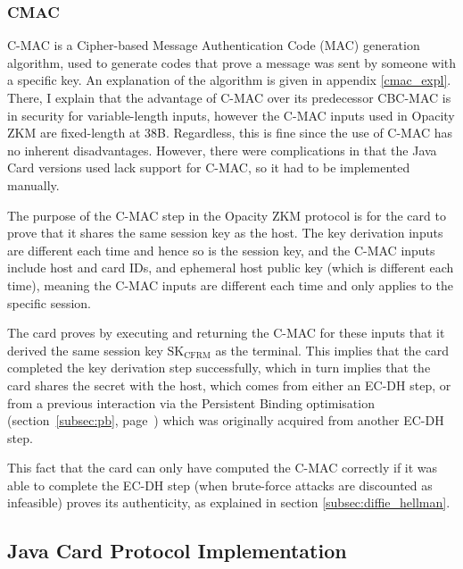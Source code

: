 \documentclass[12pt,a4paper]{article}
\begin{document}
\subsubsection{CMAC}
\label{subsec:cmac}
C-MAC is a Cipher-based Message Authentication Code (MAC) generation algorithm, used to generate codes that prove a message was sent by someone with a specific key. An explanation of the algorithm is given in appendix \ref{cmac_expl}. There, I explain that the advantage of C-MAC over its predecessor CBC-MAC is in security for variable-length inputs, however the C-MAC inputs used in Opacity ZKM are fixed-length at 38B. Regardless, this is fine since the use of C-MAC has no inherent disadvantages. However, there were complications in that the Java Card versions used lack support for C-MAC, so it had to be implemented manually.

The purpose of the C-MAC step in the Opacity ZKM protocol is for the card to prove that it shares the same session key as the host. The key derivation inputs are different each time and hence so is the session key, and the C-MAC inputs include host and card IDs, and ephemeral host public key (which is different each time), meaning the C-MAC inputs are different each time and only applies to the specific session. 

The card proves by executing and returning the C-MAC for these inputs that it derived the same session key $\text{SK}_{\text{CFRM}}$ as the terminal. This implies that the card completed the key derivation step successfully, which in turn implies that the card shares the secret with the host, which comes from either an EC-DH step, or from a previous interaction via the Persistent Binding optimisation  (section~\ref{subsec:pb}, page~\pageref{subsec:pb}) which was originally acquired from another EC-DH step.

This fact that the card can only have computed the C-MAC correctly if it was able to complete the EC-DH step (when brute-force attacks are discounted as infeasible) proves its authenticity, as explained in section \ref{subsec:diffie_hellman}.



\subsection{Java Card Protocol Implementation}
\end{document}
